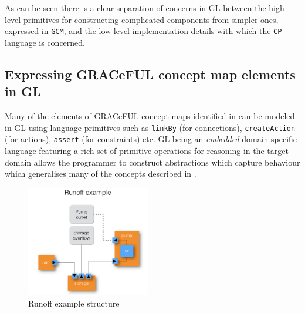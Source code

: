 As can be seen there is a clear separation of concerns in GL between
the high level primitives for constructing complicated components from
simpler ones, expressed in \texttt{GCM}, and the low level
implementation details with which the \texttt{CP} language is
concerned.

\subsection{Expressing GRACeFUL concept map elements in GL}
Many of the elements of GRACeFUL concept maps identified in
\cite{D4.1} can be modeled in GL using language primitives such as
\texttt{linkBy} (for connections), \texttt{createAction} (for
actions), \texttt{assert} (for constraints) etc.
GL being an \textit{embedded} domain specific language featuring a
rich set of primitive operations for reasoning in the target domain
allows the programmer to construct abstractions which capture
behaviour which generalises many of the concepts described in
\cite{D4.1}.
%
\begin{figure}
  \centering
\includegraphics[width=0.48\textwidth]{fig/RunoffExample.jpg}
  \caption{Runoff example structure}
  \label{fig:RunoffEx}
\end{figure}
%
